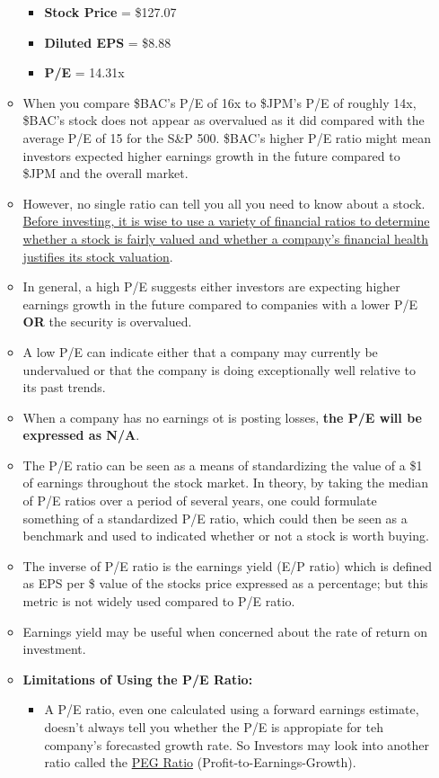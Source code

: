 \documentclass{article}
\begin{document}
\begin{itemize}
\begin{itemize}
						\begin{itemize}
							\item {\bf Stock Price} = \$127.07
							\item {\bf Diluted EPS} = \$8.88
							\item {\bf P/E} = 14.31x
						\end{itemize}
					\item When you compare \$BAC's P/E of 16x to \$JPM's P/E of roughly 14x, \$BAC's stock does not appear as overvalued as it did compared with the average P/E of 15 for the S\&P 500. \$BAC's higher P/E ratio might mean investors expected higher earnings growth in the future compared to \$JPM and the overall market.
					\item However, no single ratio can tell you all you need to know about a stock. \underline{Before investing, it is wise to use a variety of financial ratios to determine whether a stock 
						is fairly valued and whether a company's financial health justifies its stock valuation}.
					\item In general, a high P/E suggests either investors are expecting higher earnings growth in the future compared to companies with a lower P/E {\bf OR} the security is overvalued.
					\item A low P/E can indicate either that a company may currently be undervalued or that the company is doing exceptionally well relative to its past trends.
					\item When a company has no earnings ot is posting losses, {\bf the P/E will be expressed as N/A}. 
					\item The P/E ratio can be seen as a means of standardizing the value of a \$1 of earnings throughout the stock market. In theory, by taking the median of P/E ratios over a period of several years, one could formulate something of a standardized P/E ratio, which could then be seen as a benchmark and used to indicated whether or not a stock is worth buying. 
					\item The inverse of P/E ratio is the earnings yield (E/P ratio) which is defined as EPS per \$ value of the stocks price expressed as a percentage; but this metric is not widely used compared to P/E ratio.
					\item Earnings yield may be useful when concerned about the rate of return on investment.
					\item {\bf Limitations of Using the P/E Ratio:}
						\begin{itemize}
							\item A P/E ratio, even one calculated using a forward earnings estimate, doesn't always tell you whether the P/E is appropiate for teh company's forecasted growth rate. So Investors may look into another ratio called the \underline{PEG Ratio} (Profit-to-Earnings-Growth).
						\end{itemize}


\end{itemize}
\end{itemize}
\end{document}
